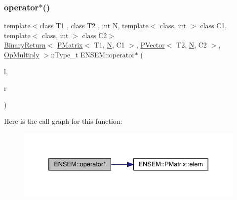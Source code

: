 \subsubsection{\texorpdfstring{operator$\ast$()}{operator*()}\hspace{0.1cm}{\footnotesize\ttfamily [3/3]}}
{\footnotesize\ttfamily template$<$class T1 , class T2 , int N, template$<$ class, int $>$ class C1, template$<$ class, int $>$ class C2$>$ \\
\mbox{\hyperlink{structENSEM_1_1BinaryReturn}{Binary\+Return}}$<$ \mbox{\hyperlink{classENSEM_1_1PMatrix}{P\+Matrix}}$<$ T1, \mbox{\hyperlink{operator__name__util_8cc_a7722c8ecbb62d99aee7ce68b1752f337}{N}}, C1 $>$, \mbox{\hyperlink{classENSEM_1_1PVector}{P\+Vector}}$<$ T2, \mbox{\hyperlink{operator__name__util_8cc_a7722c8ecbb62d99aee7ce68b1752f337}{N}}, C2 $>$, \mbox{\hyperlink{structENSEM_1_1OpMultiply}{Op\+Multiply}} $>$\+::Type\+\_\+t E\+N\+S\+E\+M\+::operator$\ast$ (\begin{DoxyParamCaption}\item[{const \mbox{\hyperlink{classENSEM_1_1PMatrix}{P\+Matrix}}$<$ T1, \mbox{\hyperlink{operator__name__util_8cc_a7722c8ecbb62d99aee7ce68b1752f337}{N}}, C1 $>$ \&}]{l,  }\item[{const \mbox{\hyperlink{classENSEM_1_1PVector}{P\+Vector}}$<$ T2, \mbox{\hyperlink{operator__name__util_8cc_a7722c8ecbb62d99aee7ce68b1752f337}{N}}, C2 $>$ \&}]{r }\end{DoxyParamCaption})\hspace{0.3cm}{\ttfamily [inline]}}

Here is the call graph for this function\+:\nopagebreak
\begin{figure}[H]
\begin{center}
\leavevmode
\includegraphics[width=332pt]{d3/dc4/group__primvector_gabc873d4c0d9c1d0ff8638e1674f29a72_cgraph}
\end{center}
\end{figure}
\mbox{\label{group__primvector_gadeef49e413dc749206be2cdd675cd802}} 
